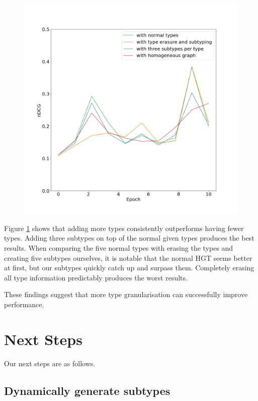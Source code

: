 \begin{figure}[H]
\includegraphics[width=.9\linewidth]{./images/proposal-plot.png}
\caption{}
\label{fig:results} %
\end{figure}


Figure \ref{fig:results} shows that adding more types consistently outperforms having fewer types.
Adding three subtypes on top of the normal given types produces the best results.
When comparing the five normal types with erasing the types and creating five subtypes ourselves, it is notable that the normal HGT seems better at first, but our subtypes quickly catch up and surpass them.
Completely erasing all type information predictably produces the worst results.

These findings suggest that more type granularisation can successfully improve performance.


\section{Next Steps}

Our next steps are as follows.

\subsection{Dynamically generate subtypes}

